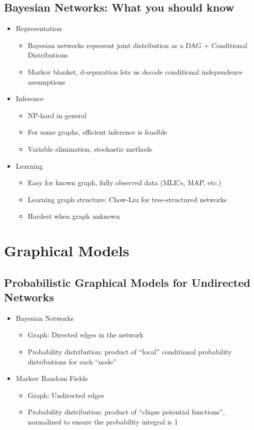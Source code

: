 \documentclass[10pt]{article}
\begin{document}
\subsection*{Bayesian Networks: What you should know}
\begin{itemize}
	\item Representation
	\begin{itemize}
	    \item Bayesian networks represent joint distribution as a DAG + Conditional Distributions
	    \item Markov blanket, d-separation lets us decode conditional independence assumptions
    \end{itemize}
	\item Inference
	\begin{itemize}
	    \item NP-hard in general
	    \item For some graphs, efficient inference is feasible
	    \item Variable elimination, stochastic methods
    \end{itemize}
	\item Learning
	\begin{itemize}
	    \item Easy for known graph, fully observed data (MLE's, MAP, etc.)
	    \item Learning graph structure: Chow-Liu for tree-structured networks
	    \item Hardest when graph unknown
    \end{itemize}
\end{itemize}

\section*{Graphical Models}
\subsection*{Probabilistic Graphical Models for Undirected Networks}
\begin{itemize}
	\item Bayesian Networks
	\begin{itemize}
	    \item Graph: Directed edges in the network
	    \item Probability distribution: product of ``local'' conditional probability distributions for each ``node''
    \end{itemize}   
	\item Markov Random Fields
	\begin{itemize}
	    \item Graph: Undirected edges
	    \item Probability distribution: product of ``clique potential functions'', normalized to ensure the probability integral is 1
    \end{itemize}
\end{itemize}
\end{document}
